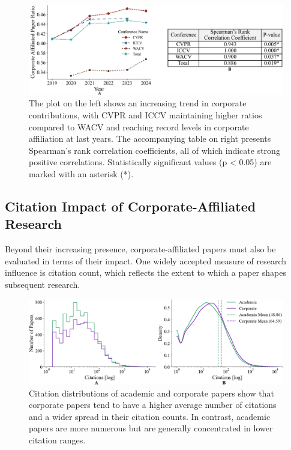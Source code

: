 \documentclass{article}
\begin{document}
\begin{figure}[ht]
    \centering
    \includegraphics[width=0.9\linewidth]{report/images/corporate_ratio_table.png}
    \caption{The plot on the left shows an increasing trend in corporate contributions, with CVPR and ICCV maintaining higher ratios compared to WACV and reaching record levels in corporate affiliation at last years. The accompanying table on right presents Spearman’s rank correlation coefficients, all of which indicate strong positive correlations. Statistically significant values (p < 0.05) are marked with an asterisk (*).}
    \label{fig:corporate_ratio_graph}
\end{figure}
\vspace{-15pt}
\subsection{Citation Impact of Corporate-Affiliated Research}
\vspace{-7pt}
Beyond their increasing presence, corporate-affiliated papers must also be evaluated in terms of their impact. One widely accepted measure of research influence is citation count, which reflects the extent to which a paper shapes subsequent research.
\begin{figure}[ht]
    \centering
    \vspace{-10pt}
    \includegraphics[width=0.9\linewidth]{report/images/ieee_citations.png}
    \caption{Citation distributions of academic and corporate papers show that corporate papers tend to have a higher average number of citations and a wider spread in their citation counts. In contrast, academic papers are more numerous but are generally concentrated in lower citation ranges.}
    \label{fig:ieee_citations}
    \vspace{-15pt}
\end{figure}
\end{document}
